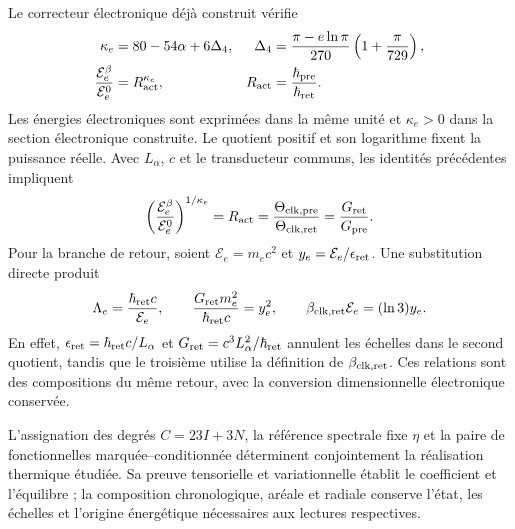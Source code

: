 Le correcteur électronique déjà construit vérifie
\begin{align}
 \kappa_e&=80-54\alpha+6\Delta_4,&
 \Delta_4&=\frac{\pi-e\ln\pi}{270}
                 \left(1+\frac\pi{729}\right),\nonumber\\
 \frac{\mathcal E_e^{\beta}}{\mathcal E_e^0}
 &=R_{\rm act}^{\kappa_e},&
 R_{\rm act}&=\frac{\hbar_{\rm pre}}{\hbar_{\rm ret}}.
 \label{eq:ii-ter27-electron-return}
\end{align}
Les énergies électroniques sont exprimées dans la même unité et
$\kappa_e>0$ dans la section électronique construite. Le quotient
positif et son logarithme fixent la puissance réelle. Avec $L_\alpha$, $c$ et
le transducteur communs, les identités précédentes impliquent
\begin{equation}
 \left(\frac{\mathcal E_e^{\beta}}{\mathcal E_e^0}\right)^{1/\kappa_e}
 =R_{\rm act}
 =\frac{\Theta_{{\rm clk,pre}}}{\Theta_{{\rm clk,ret}}}
 =\frac{G_{\rm ret}}{G_{\rm pre}}.
 \label{eq:ii-ter27-return-ratios}
\end{equation}
Pour la branche de retour, soient $\mathcal E_e=m_ec^2$ et
$y_e=\mathcal E_e/\epsilon_{\rm ret}$. Une substitution directe produit
\begin{equation}
 \Lambda_e=\frac{\hbar_{\rm ret}c}{\mathcal E_e},\qquad
 \frac{G_{\rm ret}m_e^2}{\hbar_{\rm ret}c}=y_e^2,\qquad
 \beta_{{\rm clk,ret}}\mathcal E_e=(\ln3)y_e.
 \label{eq:ii-ter27-electron-gravity}
\end{equation}
En effet, $\epsilon_{\rm ret}=\hbar_{\rm ret}c/L_\alpha$ et
$G_{\rm ret}=c^3L_\alpha^2/\hbar_{\rm ret}$ annulent les échelles
dans le second quotient, tandis que le troisième utilise la définition de
$\beta_{{\rm clk,ret}}$. Ces relations sont des compositions du même
retour, avec la conversion dimensionnelle électronique conservée.

L’assignation des degrés $C=23I+3N$, la référence spectrale fixe $\eta$
et la paire de fonctionnelles marquée--conditionnée déterminent conjointement
la réalisation thermique étudiée. Sa preuve tensorielle et variationnelle
établit le coefficient et l’équilibre ; la composition chronologique,
aréale et radiale conserve l’état, les échelles et l’origine énergétique
nécessaires aux lectures respectives.
